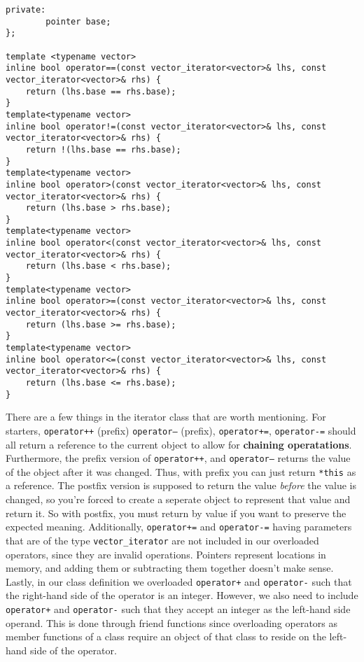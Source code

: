 \documentclass{report}
\begin{document}
\begin{verbatim}
private:
        pointer base;
};

template <typename vector>
inline bool operator==(const vector_iterator<vector>& lhs, const vector_iterator<vector>& rhs) {
    return (lhs.base == rhs.base);
}
template<typename vector>
inline bool operator!=(const vector_iterator<vector>& lhs, const vector_iterator<vector>& rhs) {
    return !(lhs.base == rhs.base);
}
template<typename vector>
inline bool operator>(const vector_iterator<vector>& lhs, const vector_iterator<vector>& rhs) {
    return (lhs.base > rhs.base);
}
template<typename vector>
inline bool operator<(const vector_iterator<vector>& lhs, const vector_iterator<vector>& rhs) {
    return (lhs.base < rhs.base);
}
template<typename vector>
inline bool operator>=(const vector_iterator<vector>& lhs, const vector_iterator<vector>& rhs) {
    return (lhs.base >= rhs.base);
}
template<typename vector>
inline bool operator<=(const vector_iterator<vector>& lhs, const vector_iterator<vector>& rhs) {
    return (lhs.base <= rhs.base);
}
\end{verbatim}
There are a few things in the iterator class that are worth mentioning. For starters, \texttt{operator++} (prefix) \texttt{operator--} (prefix), \texttt{operator+=}, \texttt{operator-=} should all return a reference to the current object to allow for \textbf{chaining operatations}. Furthermore, the prefix version of \texttt{operator++}, and \texttt{operator--} returns the value of the object after it was changed. Thus, with prefix you can just return \texttt{*this} as a reference. The postfix version is supposed to return the value \textit{before} the value is changed, so you're forced to create a seperate object to represent that value and return it. So with postfix, you must return by value if you want to preserve the expected meaning.
\bigbreak \noindent
Additionally, \texttt{operator+=} and \texttt{operator-=} having parameters that are of the type \texttt{vector\_iterator} are not included in our overloaded operators, since they are invalid operations. Pointers represent locations in memory, and adding them or subtracting them together doesn't make sense.
\bigbreak \noindent
Lastly, in our class definition we overloaded \texttt{operator+} and \texttt{operator-} such that the right-hand side of the operator is an integer. However, we also need to include \texttt{operator+} and \texttt{operator-} such that they accept an integer as the left-hand side operand. This is done through friend functions since overloading operators as member functions of a class require an object of that class to reside on the left-hand side of the operator.
\end{document}
